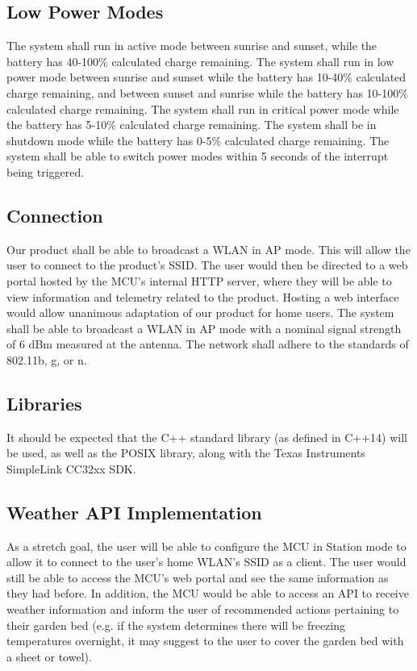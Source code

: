 \documentclass[journal]{IEEEtran}
\begin{document}
\subsection{Low Power Modes} The system shall run in active mode between sunrise and sunset, while the battery has 40-100\% calculated charge remaining. The system shall run in low power mode between sunrise and sunset while the battery has 10-40\% calculated charge remaining, and between sunset and sunrise while the battery has 10-100\% calculated charge remaining. The system shall run in critical power mode while the battery has 5-10\% calculated charge remaining. The system shall be in shutdown mode while the battery has 0-5\% calculated charge remaining. The system shall be able to switch power modes within 5 seconds of the interrupt being triggered.

\subsection{Connection}
Our product shall be able to broadcast a WLAN in AP mode. This will allow the user to connect to the product's SSID. The user would then be directed to a web portal hosted by the MCU's internal HTTP server, where they will be able to view information and telemetry related to the product. Hosting a web interface would allow unanimous adaptation of our product for home users. The system shall be able to broadcast a WLAN in AP mode with a nominal signal strength of 6 dBm measured at the antenna. The network shall adhere to the standards of 802.11b, g, or n. 

\subsection{Libraries}
It should be expected that the C++ standard library (as defined in C++14) will be used, as well as the POSIX library, along with the Texas Instruments SimpleLink CC32xx SDK.

\subsection{Weather API Implementation}
As a stretch goal, the user will be able to configure the MCU in Station mode to allow it to connect to the user's home WLAN's SSID as a client. The user would still be able to access the MCU's web portal and see the same information as they had before. In addition, the MCU would be able to access an API to receive weather information and inform the user of recommended actions pertaining to their garden bed (e.g. if the system determines there will be freezing temperatures overnight, it may suggest to the user to cover the garden bed with a sheet or towel).
\end{document}
